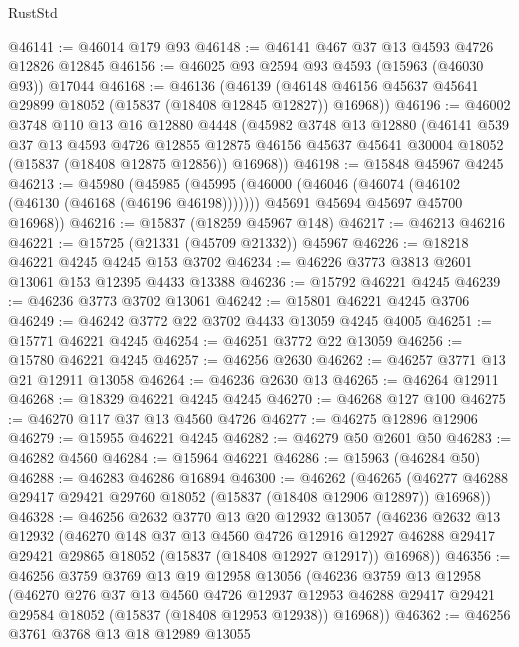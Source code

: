 \begin{lexlean}{RustStd}
\begin{coremodule}
{\begin{coremodule}
{{{{{{{{{{{{{{{{{{{{{{{{{{{{{{{{{{{{{{{{{{{{{{{{{{{{{{{{{{{{@46141 := @46014 @179 @93
@46148 := @46141 @467 @37 @13 @4593 @4726 @12826 @12845
@46156 := @46025 @93 @2594 @93 @4593 (@15963 (@46030 @93)) @17044
@46168 := @46136
    (@46139 (@46148 @46156 @45637 @45641 @29899 @18052 (@15837 (@18408 @12845 @12827)) @16968))
@46196 := @46002
    @3748
    @110
    @13
    @16
    @12880
    @4448
    (@45982
      @3748
      @13
      @12880
      (@46141
        @539
        @37
        @13
        @4593
        @4726
        @12855
        @12875
        @46156
        @45637
        @45641
        @30004
        @18052
        (@15837 (@18408 @12875 @12856))
        @16968))
@46198 := @15848 @45967 @4245
@46213 := @45980
    (@45985
      (@45995
        (@46000 (@46046 (@46074 (@46102 (@46130 (@46168 (@46196 @46198)))))))
        @45691
        @45694
        @45697
        @45700
        @16968))
@46216 := @15837 (@18259 @45967 @148)
@46217 := @46213 @46216
@46221 := @15725 (@21331 (@45709 @21332)) @45967
@46226 := @18218 @46221 @4245 @4245 @153 @3702
@46234 := @46226 @3773 @3813 @2601 @13061 @153 @12395 @4433 @13388
@46236 := @15792 @46221 @4245
@46239 := @46236 @3773 @3702 @13061
@46242 := @15801 @46221 @4245 @3706
@46249 := @46242 @3772 @22 @3702 @4433 @13059 @4245 @4005
@46251 := @15771 @46221 @4245
@46254 := @46251 @3772 @22 @13059
@46256 := @15780 @46221 @4245
@46257 := @46256 @2630
@46262 := @46257 @3771 @13 @21 @12911 @13058
@46264 := @46236 @2630 @13
@46265 := @46264 @12911
@46268 := @18329 @46221 @4245 @4245
@46270 := @46268 @127 @100
@46275 := @46270 @117 @37 @13 @4560 @4726
@46277 := @46275 @12896 @12906
@46279 := @15955 @46221 @4245
@46282 := @46279 @50 @2601 @50
@46283 := @46282 @4560
@46284 := @15964 @46221
@46286 := @15963 (@46284 @50)
@46288 := @46283 @46286 @16894
@46300 := @46262
    (@46265 (@46277 @46288 @29417 @29421 @29760 @18052 (@15837 (@18408 @12906 @12897)) @16968))
@46328 := @46256
    @2632
    @3770
    @13
    @20
    @12932
    @13057
    (@46236
      @2632
      @13
      @12932
      (@46270
        @148
        @37
        @13
        @4560
        @4726
        @12916
        @12927
        @46288
        @29417
        @29421
        @29865
        @18052
        (@15837 (@18408 @12927 @12917))
        @16968))
@46356 := @46256
    @3759
    @3769
    @13
    @19
    @12958
    @13056
    (@46236
      @3759
      @13
      @12958
      (@46270
        @276
        @37
        @13
        @4560
        @4726
        @12937
        @12953
        @46288
        @29417
        @29421
        @29584
        @18052
        (@15837 (@18408 @12953 @12938))
        @16968))
@46362 := @46256 @3761 @3768 @13 @18 @12989 @13055
}}}}}}}}}}}}}}}}}}}}}}}}}}}}}}}}}}}}}}}}}}}}}}}}}}}}}}}}}}}}
\end{coremodule}}
\end{coremodule}
\end{lexlean}
